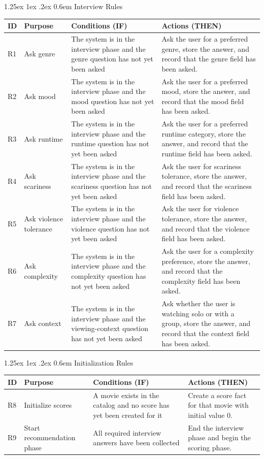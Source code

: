 \documentclass[11pt]{article}
\makeatletter
\renewcommand\paragraph{\@startsection{paragraph}{4}{\z@}%
  {1.25ex \@plus1ex \@minus.2ex}%
  {0.6em}%
  {\normalfont\normalsize\bfseries}}
\makeatother
\begin{document}
\paragraph{Interview Rules}
\renewcommand{\arraystretch}{1.15}
\begin{tabularx}{\textwidth}{@{}l l X X@{}}
\toprule
\textbf{ID} & \textbf{Purpose} & \textbf{Conditions (IF)} & \textbf{Actions (THEN)} \\
\midrule
R1 & Ask genre &
The system is in the interview phase and the genre question has not yet been asked &
Ask the user for a preferred genre, store the answer, and record that the genre field has been asked. \\
R2 & Ask mood &
The system is in the interview phase and the mood question has not yet been asked &
Ask the user for a preferred mood, store the answer, and record that the mood field has been asked. \\
R3 & Ask runtime &
The system is in the interview phase and the runtime question has not yet been asked &
Ask the user for a preferred runtime category, store the answer, and record that the runtime field has been asked. \\
R4 & Ask scariness &
The system is in the interview phase and the scariness question has not yet been asked &
Ask the user for scariness tolerance, store the answer, and record that the scariness field has been asked. \\
R5 & Ask violence tolerance &
The system is in the interview phase and the violence question has not yet been asked &
Ask the user for violence tolerance, store the answer, and record that the violence field has been asked. \\
R6 & Ask complexity &
The system is in the interview phase and the complexity question has not yet been asked &
Ask the user for a complexity preference, store the answer, and record that the complexity field has been asked. \\
R7 & Ask context &
The system is in the interview phase and the viewing-context question has not yet been asked &
Ask whether the user is watching solo or with a group, store the answer, and record that the context field has been asked. \\
\bottomrule
\end{tabularx}

\paragraph{Initialization Rules}
\begin{tabularx}{\textwidth}{@{}l l X X@{}}
\toprule
\textbf{ID} & \textbf{Purpose} & \textbf{Conditions (IF)} & \textbf{Actions (THEN)} \\
\midrule
R8 & Initialize scores &
A movie exists in the catalog and no score has yet been created for it &
Create a score fact for that movie with initial value $0$. \\
R9 & Start recommendation phase &
All required interview answers have been collected &
End the interview phase and begin the scoring phase. \\
\bottomrule
\end{tabularx}
\end{document}
